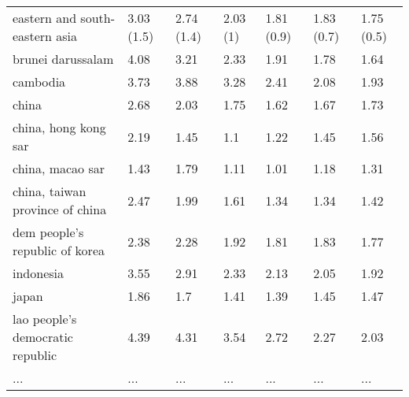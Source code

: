\begin{table}[!h]
\begin{tabular}[t]{lllllll}
eastern and south-eastern asia & 3.03 (1.5) & 2.74 (1.4) & 2.03 (1) & 1.81 (0.9) & 1.83 (0.7) & 1.75 (0.5)\\
brunei darussalam & 4.08 & 3.21 & 2.33 & 1.91 & 1.78 & 1.64\\
\addlinespace
cambodia & 3.73 & 3.88 & 3.28 & 2.41 & 2.08 & 1.93\\
china & 2.68 & 2.03 & 1.75 & 1.62 & 1.67 & 1.73\\
china, hong kong sar & 2.19 & 1.45 & 1.1 & 1.22 & 1.45 & 1.56\\
china, macao sar & 1.43 & 1.79 & 1.11 & 1.01 & 1.18 & 1.31\\
china, taiwan province of china & 2.47 & 1.99 & 1.61 & 1.34 & 1.34 & 1.42\\
\addlinespace
dem people's republic of korea & 2.38 & 2.28 & 1.92 & 1.81 & 1.83 & 1.77\\
indonesia & 3.55 & 2.91 & 2.33 & 2.13 & 2.05 & 1.92\\
japan & 1.86 & 1.7 & 1.41 & 1.39 & 1.45 & 1.47\\
lao people's democratic republic & 4.39 & 4.31 & 3.54 & 2.72 & 2.27 & 2.03\\
... & ... & ... & ... & ... & ... & ...\\
\bottomrule
\end{tabular}
\end{table}
